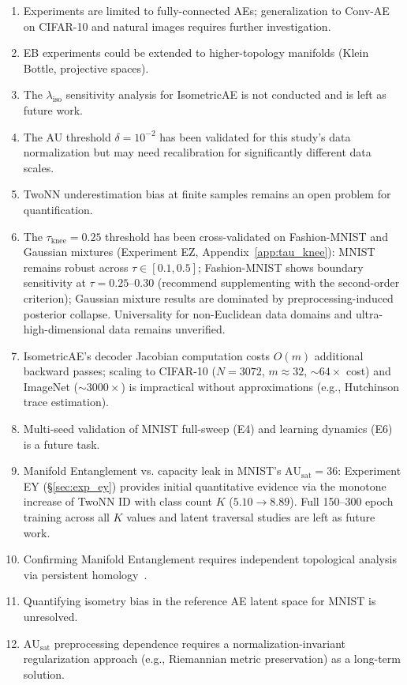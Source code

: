 \documentclass[lettersize,journal]{IEEEtran}
\newcommand{\AUsat}{\mathrm{AU}_{\mathrm{sat}}}
\begin{document}
\begin{enumerate}
  \item Experiments are limited to fully-connected AEs; generalization to Conv-AE on CIFAR-10 and natural images requires further investigation.
  \item EB experiments could be extended to higher-topology manifolds (Klein Bottle, projective spaces).
  \item The $\lambda_\mathrm{iso}$ sensitivity analysis for IsometricAE is not conducted and is left as future work.
  \item The AU threshold $\delta = 10^{-2}$ has been validated for this study's data normalization but may need recalibration for significantly different data scales.
  \item TwoNN underestimation bias at finite samples remains an open problem for quantification.
  \item The $\tau_\mathrm{knee} = 0.25$ threshold has been cross-validated on Fashion-MNIST and Gaussian mixtures (Experiment EZ, Appendix~\ref{app:tau_knee}): MNIST remains robust across $\tau\in[0.1,0.5]$; Fashion-MNIST shows boundary sensitivity at $\tau=0.25$--$0.30$ (recommend supplementing with the second-order criterion); Gaussian mixture results are dominated by preprocessing-induced posterior collapse. Universality for non-Euclidean data domains and ultra-high-dimensional data remains unverified.
  \item IsometricAE's decoder Jacobian computation costs $O(m)$ additional backward passes; scaling to CIFAR-10 ($N=3072$, $m\approx32$, $\sim64\times$ cost) and ImageNet ($\sim3000\times$) is impractical without approximations (e.g., Hutchinson trace estimation).
  \item Multi-seed validation of MNIST full-sweep (E4) and learning dynamics (E6) is a future task.
  \item Manifold Entanglement vs. capacity leak in MNIST's $\AUsat=36$: Experiment EY (\S\ref{sec:exp_ey}) provides initial quantitative evidence via the monotone increase of TwoNN ID with class count $K$ ($5.10 \to 8.89$). Full 150--300 epoch training across all $K$ values and latent traversal studies are left as future work.
  \item Confirming Manifold Entanglement requires independent topological analysis via persistent homology~\cite{carlsson2009topology}.
  \item Quantifying isometry bias in the reference AE latent space for MNIST is unresolved.
  \item $\AUsat$ preprocessing dependence requires a normalization-invariant regularization approach (e.g., Riemannian metric preservation) as a long-term solution.
\end{enumerate}
\end{document}
